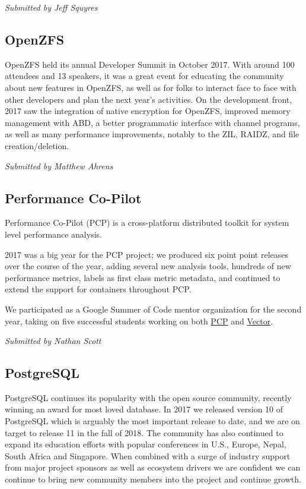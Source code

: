 \documentclass[a4paper]{report}
\begin{document}
{\em Submitted by Jeff Squyres}

\subsection{OpenZFS}

OpenZFS held its annual Developer Summit in October 2017.  With around
100 attendees and 13 speakers, it was a great event for educating the
community about new features in OpenZFS, as well as for folks to
interact face to face with other developers and plan the next year's
activities.  On the development front, 2017 saw the integration of
native encryption for OpenZFS, improved memory management with ABD, a
better programmatic interface with channel programs, as well as many
performance improvements, notably to the ZIL, RAIDZ, and file
creation/deletion.

{\em Submitted by Matthew Ahrens}

\subsection{Performance Co-Pilot}

Performance Co-Pilot (PCP) is a cross-platform distributed toolkit for
system level performance analysis.

2017 was a big year for the PCP project; we produced six point point
releases over the course of the year, adding several new analysis tools,
hundreds of new performance metrics, labels as first class metric
metadata, and continued to extend the support for containers throughout
PCP.

We participated as a Google Summer of Code mentor organization for the
second year, taking on five successful students working on both
\href{http://pcp.io/}{PCP} and \href{http://getvector.io}{Vector}.

{\em Submitted by Nathan Scott}

\subsection{PostgreSQL}

PostgreSQL continues its popularity with the open source community,
recently winning an award for most loved database. In 2017 we released
version 10 of PostgreSQL which is arguably the most important release to
date, and we are on target to release 11 in the fall of 2018.  The
community has also continued to expand its education efforts with
popular conferences in U.S., Europe, Nepal, South Africa and Singapore.
When combined with a surge of industry support from major project
sponsors as well as ecosystem drivers we are confident we can continue
to bring new community members into the project and continue growth.
\end{document}
